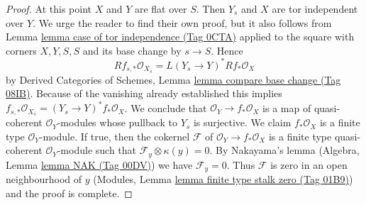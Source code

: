 \documentclass{amsart}
\theoremstyle{plain}
\theoremstyle{definition}
\theoremstyle{remark}
\numberwithin{equation}{subsection}
\begin{document}
\begin{proof}
\medskip\noindent
At this point $X$ and $Y$ are flat over $S$. Then $Y_s$ and $X$
are tor independent over $Y$. We urge the reader to find their own
proof, but it also follows from
Lemma \href{https://stacks.math.columbia.edu/tag/0CTA}{lemma case of tor independence (Tag 0CTA)} applied to the
square with corners $X, Y, S, S$ and its base change by $s \to S$.
Hence
$$
Rf_{s, *}\mathcal{O}_{X_s} = L(Y_s \to Y)^*Rf_*\mathcal{O}_X
$$
by Derived Categories of Schemes, Lemma
\href{https://stacks.math.columbia.edu/tag/08IB}{lemma compare base change (Tag 08IB)}.
Because of the vanishing already established this implies
$f_{s, *}\mathcal{O}_{X_s} = (Y_s \to Y)^*f_*\mathcal{O}_X$.
We conclude that $\mathcal{O}_Y \to f_*\mathcal{O}_X$ is a map of
quasi-coherent $\mathcal{O}_Y$-modules whose pullback
to $Y_s$ is surjective. We claim
$f_*\mathcal{O}_X$ is a finite type $\mathcal{O}_Y$-module.
If true, then the cokernel $\mathcal{F}$ of
$\mathcal{O}_Y \to f_*\mathcal{O}_X$
is a finite type quasi-coherent $\mathcal{O}_Y$-module
such that $\mathcal{F}_y \otimes \kappa(y) = 0$.
By Nakayama's lemma (Algebra, Lemma \href{https://stacks.math.columbia.edu/tag/00DV}{lemma NAK (Tag 00DV)})
we have $\mathcal{F}_y = 0$. Thus $\mathcal{F}$ is zero
in an open neighbourhood of $y$
(Modules, Lemma \href{https://stacks.math.columbia.edu/tag/01B9}{lemma finite type stalk zero (Tag 01B9)})
and the proof is complete.


\end{proof}
\end{document}
